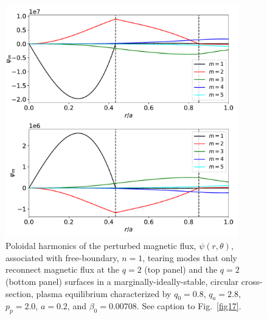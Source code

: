\documentclass[12pt,prb,aps]{revtex4-1}
\providecommand{\DIFadd}[1]{{\protect\color{blue}\uwave{#1}}} %
\providecommand{\DIFdel}[1]{{\protect\color{red}\sout{#1}}}                      %
\providecommand{\DIFaddFL}[1]{\DIFadd{#1}} %
\providecommand{\DIFdelFL}[1]{\DIFdel{#1}} %
\providecommand{\DIFaddbeginFL}{} %
\providecommand{\DIFaddendFL}{} %
\providecommand{\DIFdelbeginFL}{} %
\providecommand{\DIFdelendFL}{} %
\newcommand{\DIFscaledelfig}{0.5}
\newlength{\DIFdelgraphicswidth} %
\newlength{\DIFdelgraphicsheight} %
\newcommand{\DIFaddincludegraphics}[2][]{{\color{blue}\fbox{\DIFOincludegraphics[#1]{#2}}}} %
\newcommand{\DIFdelincludegraphics}[2][]{%
\sbox{\DIFdelgraphicsbox}{\DIFOincludegraphics[#1]{#2}}%
\settoboxwidth{\DIFdelgraphicswidth}{\DIFdelgraphicsbox} %
\settoboxtotalheight{\DIFdelgraphicsheight}{\DIFdelgraphicsbox} %
\scalebox{\DIFscaledelfig}{%
\parbox[b]{\DIFdelgraphicswidth}{\usebox{\DIFdelgraphicsbox}\\[-\baselineskip] \rule{\DIFdelgraphicswidth}{0em}}\llap{\resizebox{\DIFdelgraphicswidth}{\DIFdelgraphicsheight}{%
\setlength{\unitlength}{\DIFdelgraphicswidth}%
\begin{picture}(1,1)%
\thicklines\linethickness{2pt} %
{\color[rgb]{1,0,0}\put(0,0){\framebox(1,1){}}}%
{\color[rgb]{1,0,0}\put(0,0){\line( 1,1){1}}}%
{\color[rgb]{1,0,0}\put(0,1){\line(1,-1){1}}}%
\end{picture}%
}\hspace*{3pt}}} %
} %
\DeclareRobustCommand{\DIFaddbeginFL}{\DIFOaddbeginFL \let\includegraphics\DIFaddincludegraphics} %
\DeclareRobustCommand{\DIFaddendFL}{\DIFOaddendFL \let\includegraphics\DIFOincludegraphics} %
\DeclareRobustCommand{\DIFdelbeginFL}{\DIFOdelbeginFL \let\includegraphics\DIFdelincludegraphics} %
\DeclareRobustCommand{\DIFdelendFL}{\DIFOaddendFL \let\includegraphics\DIFOincludegraphics} %
\begin{document}
\begin{figure}
\centerline{\includegraphics[width=0.9\textwidth]{Fig19.pdf}}
\caption{Poloidal harmonics of the perturbed magnetic flux, $\psi(r,\theta)$,  associated with free-boundary, $n=1$, tearing modes that only reconnect magnetic flux at the \DIFdelbeginFL \DIFdelFL{$q=2$  }\DIFdelendFL \DIFaddbeginFL \DIFaddFL{$q=1$  }\DIFaddendFL (top panel) and the $q=2$ (bottom panel) surfaces in a marginally-ideally-stable, 
circular cross-section,  plasma equilibrium characterized by $q_0=0.8$, $q_a= 2.8$, $p_p=2.0$, 
$a=0.2$, and $\beta_0=0.00708$. See caption to Fig.~\ref{fig17}.\label{fig19}}
\end{figure}
\end{document}
